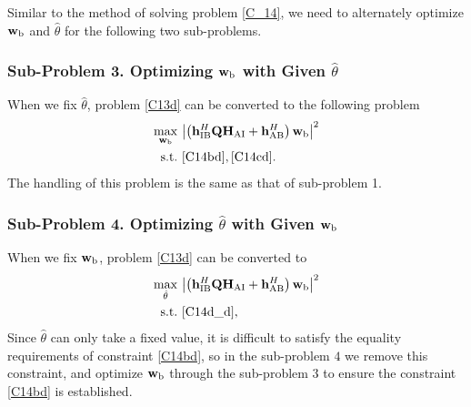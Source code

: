 \documentclass[10pt,journal,letterpaper,twocolumn,twoside]{IEEEtran} %
\begin{document}
Similar to the method of solving  problem \eqref{C_14},   we need to alternately optimize ${{\mathbf{w}}_{\rm{b}}}$ and ${{\hat \theta }}$ for the following two sub-problems.


 \subsubsection{{{Sub-Problem 3. Optimizing ${{\mathbf{w}}_{\rm{b}}}$ with Given ${{\hat \theta }}$}}}

When we fix ${{\hat \theta }}$, problem \eqref{C13d} can be converted to the following problem
\begin{align}\label{C20d}
 \mathop {\max }\limits_{{{\mathbf{w}}_{\rm{b}}}} ~&{\left| {\left( {{\bf{h}}_{{\rm{IB}}}^H{\bf{Q}}{{\bf{H}}_{{\rm{AI}}}} + {\bf{h}}_{{\rm{AB}}}^H} \right){{\bf{w}}_{\rm{b}}}} \right|^2}\\
 {\rm{s.t.}}~&\eqref{C14bd},\eqref{C14cd}\notag.
 \end{align}
 The handling of this problem is the same as that of sub-problem 1.


  \subsubsection{{{Sub-Problem 4. Optimizing ${{\hat \theta }}$ with Given ${{\mathbf{w}}_{\rm{b}}}$}}}

When we fix ${{\mathbf{w}}_{\rm{b}}}$, problem \eqref{C13d} can be converted to
\begin{align}\label{C15d}
 \mathop {\max }\limits_{{{\hat \theta }}} ~&{{{{\left| {\left( {{\bf{h}}_{{\rm{IB}}}^H{\bf{Q}}{{\bf{H}}_{{\rm{AI}}}} + {\bf{h}}_{{\rm{AB}}}^H} \right){{\bf{w}}_{\rm{b}}}} \right|}^2}}} \\
 {\rm{s.t.}}~&\eqref{C14d_d}\notag,
 \end{align}
Since ${{\hat \theta }}$ can only take a fixed value, it is difficult to satisfy the equality requirements of constraint \eqref{C14bd}, so in the sub-problem $4$ we remove this constraint, and optimize ${{\mathbf{w}}_{\rm{b}}}$ through the sub-problem $3$ to ensure  the constraint \eqref{C14bd} is established.
\end{document}
